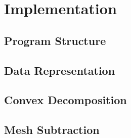 \chapter{Implementation}

\section{Program Structure}

\section{Data Representation}

\section{Convex Decomposition}

\section{Mesh Subtraction}

